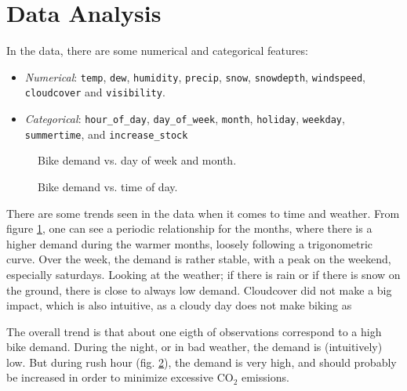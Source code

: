 \section{Data Analysis}
In the data, there are some numerical and categorical features:
\begin{itemize}
    \item \emph{Numerical}: \texttt{temp}, \texttt{dew}, \texttt{humidity}, \texttt{precip}, \texttt{snow}, \texttt{snowdepth}, \texttt{windspeed}, \texttt{cloudcover} and \texttt{visibility}.
    \item \emph{Categorical}: \texttt{hour\_of\_day}, \texttt{day\_of\_week}, \texttt{month}, \texttt{holiday}, \texttt{weekday}, \texttt{summertime}, and \texttt{increase\_stock}
\end{itemize}

\begin{figure}[htbp]
    \centering
    
    \caption{Bike demand vs. day of week and month.}
    \label{fig:demand day month}
\end{figure}

\begin{figure}[htbp]
    \centering
    
    \caption{Bike demand vs. time of day.}
    \label{fig:demand time of day}
\end{figure}

There are some trends seen in the data when it comes to time and weather. From figure \ref{fig:demand day month}, one can see a periodic relationship for the months, where there is a higher demand during the warmer months, loosely following a trigonometric curve. Over the week, the demand is rather stable, with a peak on the weekend, especially saturdays. Looking at the weather; if there is rain or if there is snow on the ground, there is close to always low demand. Cloudcover did not make a big impact, which is also intuitive, as a cloudy day does not make biking as 

The overall trend is that about one eigth of observations correspond to a high bike demand. During the night, or in bad weather, the demand is (intuitively) low. But during rush hour (fig. \ref{fig:demand time of day}), the demand is very high, and should probably be increased in order to minimize excessive CO$_2$ emissions.